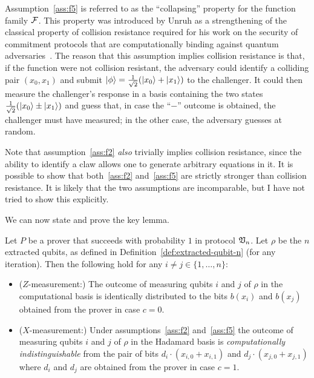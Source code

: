 \begin{remark}
Assumption~\ref{ass:f5} is referred to as the ``collapsing'' property for the function family $\mathcal{F}$. This property was introduced by Unruh as a strengthening of the classical property of collision resistance required for his work on the security of commitment protocols that are  computationally binding against quantum adversaries~\cite{unruh2016computationally}. 
The reason that this assumption implies collision resistance is that, if the function were not collision resistant, the adversary could identify a colliding pair $(x_0,x_1)$ and submit $|\phi\rangle=\frac{1}{\sqrt{2}}(|x_0\rangle+|x_1\rangle)$ to the challenger. It could then measure the challenger's response in a basis containing the two states $\frac{1}{\sqrt{2}}(|x_0\rangle\pm|x_1\rangle)$ and guess that, in case the ``$-$'' outcome is obtained, the challenger must have measured; in the other case, the adversary guesses at random. 

Note that assumption~\ref{ass:f2} \emph{also} trivially implies collision resistance, since the ability to identify a claw allows one to generate arbitrary equations in it. It is possible to show that both~\ref{ass:f2} and~\ref{ass:f5} are strictly stronger than collision resistance. It is likely that the two assumptions are incomparable, but I have not tried to show this explicitly. 
\end{remark}

We can now state and prove the key lemma. 

\begin{lemma}\label{lem:comp-ind-nqubits}
Let $P$ be a prover that succeeds with probability $1$ in protocol $\mathfrak{V}_n$. Let $\rho$ be the $n$ extracted qubits, as defined in Definition~\ref{def:extracted-qubit-n} (for any iteration). Then the following hold for any $i\neq j \in \{1,\ldots, n\}$:
\begin{itemize}
\item ($Z$-measurement:) The outcome of measuring qubits $i$ and $j$ of $\rho$ in the computational basis is identically distributed to the bits $b(x_i)$ and $b(x_j)$ obtained from the prover in case $c=0$.
\item ($X$-measurement:) Under assumptions~\ref{ass:f2} and~\ref{ass:f5} the outcome of measuring qubits $i$ and $j$ of $\rho$ in the Hadamard basis is \emph{computationally indistinguishable} from the pair of bits ${d_i\cdot(x_{i,0}+x_{i,1})}$ and ${d_j\cdot(x_{j,0}+x_{j,1})}$ where $d_i$ and $d_j$ are obtained from the prover in case $c=1$.
\end{itemize}
\end{lemma}

